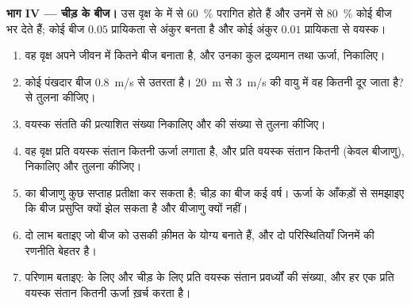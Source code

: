 \begin{problem}
\medskip
\noindent\textbf{भाग IV --- चीड़ के बीज।}
उस वृक्ष के  में से \qty{60}{\%} परागित होते हैं और उनमें से
\qty{80}{\%} कोई बीज भर देते हैं; कोई बीज $0.05$ प्रायिकता से अंकुर बनता
है और कोई अंकुर $0.01$ प्रायिकता से वयस्क।
\begin{enumerate}[resume]
  \item वह वृक्ष अपने जीवन में कितने बीज बनाता है, और उनका कुल
        द्रव्यमान तथा ऊर्जा, निकालिए।
  \item कोई पंखदार बीज \qty{0.8}{m/s} से उतरता है। \qty{20}{m} से
        \qty{3}{m/s} की वायु में वह कितनी दूर जाता है?  से
        तुलना कीजिए।
  \item वयस्क संतति की प्रत्याशित संख्या निकालिए और
         की संख्या से तुलना कीजिए।
  \item वह वृक्ष प्रति वयस्क संतान कितनी ऊर्जा लगाता है, और
         प्रति वयस्क संतान कितनी (केवल बीजाणु), निकालिए और तुलना कीजिए।
  \item {} का बीजाणु कुछ सप्ताह प्रतीक्षा कर सकता है; चीड़ का बीज कई
        वर्ष। ऊर्जा के आँकड़ों से समझाइए कि बीज प्रसुप्ति क्यों झेल
        सकता है और बीजाणु क्यों नहीं।
  \item दो लाभ बताइए जो बीज को उसकी क़ीमत के योग्य बनाते हैं, और दो
        परिस्थितियाँ जिनमें  की रणनीति बेहतर है।
  \item परिणाम बताइए:  के लिए और चीड़ के लिए प्रति वयस्क संतान
        प्रवर्ध्यों की संख्या, और हर एक प्रति वयस्क संतान कितनी ऊर्जा
        ख़र्च करता है।
\end{enumerate}
\end{problem}
